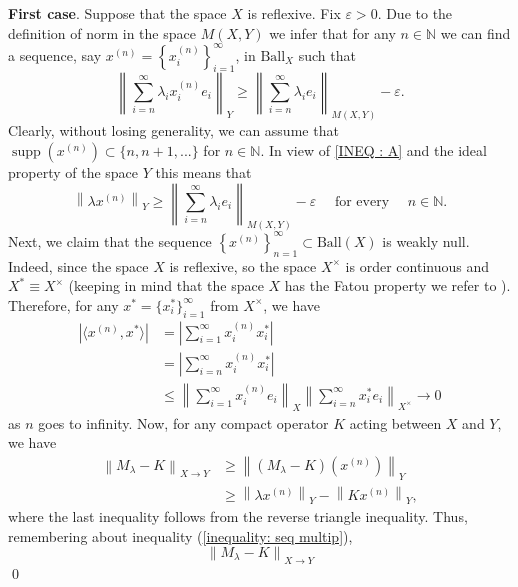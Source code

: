 \documentclass[11pt]{amsart}
\theoremstyle{definition}
\theoremstyle{definition}
\theoremstyle{definition}
\theoremstyle{definition}
\theoremstyle{definition}
\theoremstyle{definition}
\theoremstyle{definition}
\theoremstyle{definition}
\numberwithin{equation}{section}
\numberwithin{equation}{section}
\numberwithin{equation}{section}
\theoremstyle{definition}
\theoremstyle{definition}
\theoremstyle{definition}
\theoremstyle{definition}
\theoremstyle{definition}
\theoremstyle{definition}
\DeclareMathOperator{\supp}{supp}
\newcommand{\norm}[1]{\left\lVert#1\right\rVert}
\newcommand{\abs}[1]{\left\lvert#1\right\rvert}
\renewenvironment{proof}{\noindent {\bf Proof.}}{\qed}
\begin{document}
\begin{proof}
	{\bf First case}. Suppose that the space $X$ is reflexive. Fix $\varepsilon > 0$. Due to the definition of norm in the space $M(X,Y)$ we infer
	that for any $n \in \mathbb{N}$ we can find a sequence, say $x^{(n)} = \left\{ x^{(n)}_i \right\}_{i=1}^{\infty}$, in $\text{Ball}_X$ such that
	\begin{equation} \label{INEQ : A}
		\norm{ \sum_{i=n}^{\infty} \lambda_i x^{(n)}_i e_i }_Y \geqslant \norm{\sum_{i=n}^{\infty} \lambda_i e_i }_{M(X,Y)} - \varepsilon.
	\end{equation}
	Clearly, without losing generality, we can assume that $\supp\left( x^{(n)} \right) \subset \{n, n+1, ...\}$ for $n \in \mathbb{N}$.
	In view of \eqref{INEQ : A} and the ideal property of the space $Y$ this means that
	\begin{equation} \label{inequality: seq multip}
		\norm{\lambda x^{(n)}}_Y \geqslant \norm{ \sum_{i=n}^{\infty} \lambda_i e_i }_{M(X,Y)} - \varepsilon \quad \text{ for every } \quad n \in \mathbb{N}.
	\end{equation}
	Next, we claim that the sequence $\left\{ x^{(n)} \right\}_{n=1}^{\infty} \subset \text{Ball}(X)$ is weakly null.
	Indeed, since the space $X$ is reflexive, so the space $X^{\times}$ is order continuous and $X^* \equiv X^{\times}$
	(keeping in mind that the space $X$ has the Fatou property we refer to \cite[Corollaries 4.3 and 4.4, p.~23]{BS88}).
	Therefore, for any $x^* = \{ x^*_i \}_{i=1}^{\infty}$ from $X^{\times}$, we have
	\begin{align*}
		\abs{\langle x^{(n)}, x^* \rangle}
			& = \abs{\sum_{i=1}^{\infty} x^{(n)}_i x^*_i} \\
			& = \abs{\sum_{i=n}^{\infty} x^{(n)}_i x^*_i} \\
			& \leqslant \norm{ \sum_{i=1}^{\infty} x^{(n)}_i e_i }_X \norm{ \sum_{i=n}^{\infty} x^*_i e_i }_{X^{\times}} \to 0
	\end{align*}
	as $n$ goes to infinity.
	Now, for any compact operator $K$ acting between $X$ and $Y$, we have
	\begin{align*}
		\norm{M_{\lambda} - K}_{X \rightarrow Y}
			& \geqslant \norm{(M_{\lambda} - K) ( x^{(n)} ) }_Y \\
			& \geqslant \norm{\lambda x^{(n)}}_Y - \norm{K x^{(n)} }_Y,
	\end{align*}
	where the last inequality follows from the reverse triangle inequality. Thus, remembering about inequality (\ref{inequality: seq multip}),
	\begin{equation*}
		\norm{M_{\lambda} - K}_{X \rightarrow Y}

\end{equation*}
\end{proof}
\end{document}

